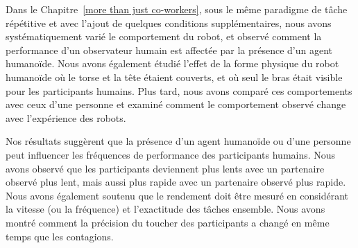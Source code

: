 Dans le Chapitre~\ref{more than just co-workers}, sous le même paradigme de tâche répétitive et avec l'ajout de quelques conditions supplémentaires, nous avons systématiquement varié le comportement du robot, et observé comment la performance d'un observateur humain est affectée par la présence d'un agent humanoïde. Nous avons également étudié l'effet de la forme physique du robot humanoïde où le torse et la tête étaient couverts, et où seul le bras était visible pour les participants humains. Plus tard, nous avons comparé ces comportements avec ceux d'une personne et examiné comment le comportement observé change avec l'expérience des robots. 





 
Nos résultats suggèrent que la présence d'un agent humanoïde ou d'une personne peut influencer les fréquences de performance des participants humains. Nous avons observé que les participants deviennent plus lents avec un partenaire observé plus lent, mais aussi plus rapide avec un partenaire observé plus rapide. Nous avons également soutenu que le rendement doit être mesuré en considérant la vitesse (ou la fréquence) et l'exactitude des tâches ensemble. Nous avons montré comment la précision du toucher des participants a changé en même temps que les contagions.






